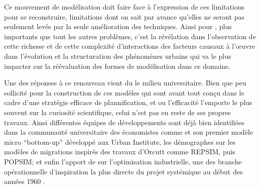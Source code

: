 {Ce mouvement de modélisation doit faire face à l'expression de ces limitations pour se reconstruire, limitations dont on sait par avance qu'elles ne seront pas seulement levés par la seule amélioration des techniques. Ainsi pour \autocite[11]{Batty1976}, plus importants que tout les autres problèmes, c'est la révélation dans l'observation de cette richesse et de cette complexité d'interactions des facteurs causaux à l’œuvre dans l'évolution et la structuration des phénomènes urbains qui va le plus impacter sur la réévaluation des formes de modélisation dans ce domaine.

Une des réponses à ce renouveau vient du le milieu universitaire. Bien que peu sollicité \autocite[9]{Batty1994} pour la construction de ces modèles qui sont avant tout conçu dans le cadre d'une stratégie efficace de plannification, et ou l'efficacité l'emporte le plus souvent sur la curiosité scientifique, celui n'est pas en reste de ses propres travaux. Ainsi différentes équipes de développements sont déjà bien identifiées dans la communauté universitaire des économistes comme \textcite{Orcutt1960} et son premier modèle micro \foreignquote{english}{bottom-up} développé aux Urban Institute, les démographes sur les modèles de migrations inspirés des travaux d'Orcutt comme REPSIM, puis POPSIM; et enfin l'apport de \textcite{Forrester1961} sur l'optimisation industrielle, une des branche opérationnelle d'inspiration la plus directe du projet systémique au début des années 1960 \autocite{Cohen1961} \autocite[911]{Shubik1960b}.

}
